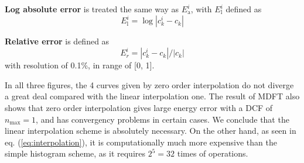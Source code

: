 \textbf{Log absolute error} is treated the same way as $E_{\mathrm{a}}^{i}$,
with $E_{\mathrm{l}}^{i}$ defined as
\begin{equation}
E_{\mathrm{l}}^{i}=\log\left|c_{k}^{i}-c_{k}\right|
\end{equation}

\textbf{Relative error} is defined as
\begin{equation}
E_{r}^{i}=\left|c_{k}^{i}-c_{k}\right|/\left|c_{k}\right|\label{eq:Er}
\end{equation}
with resolution of 0.1\%, in range of {[}0, 1{]}.

In all three figures, the 4 curves given by zero order interpolation
do not diverge a great deal compared with the linear interpolation
one. The result of MDFT also shows that zero order interpolation gives
large energy error with a DCF of $n_{\max}=1$, and has convergency
problems in certain cases. We conclude that the linear interpolation
scheme is absolutely necessary. On the other hand, as seen in eq.
(\ref{eq:interpolation}), it is computationally much more expensive
than the simple histogram scheme, as it requires $2^{5}=32$ times
of operations.
